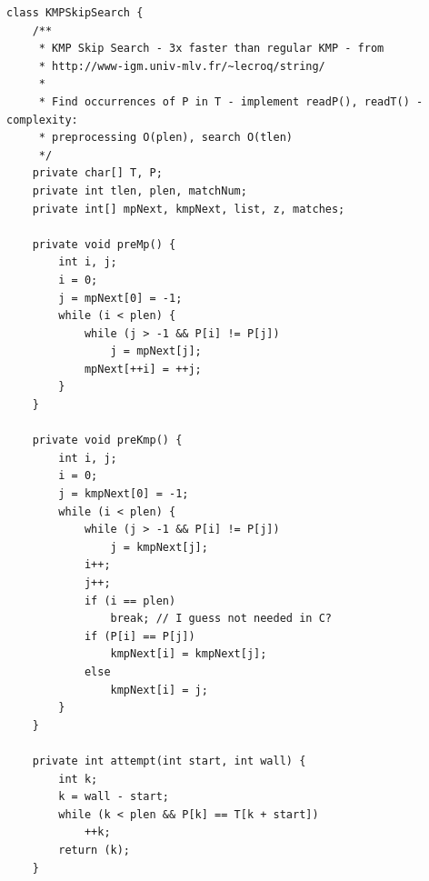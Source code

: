 \documentclass{article}
\begin{document}
\begin{verbatim}
class KMPSkipSearch {
    /**
     * KMP Skip Search - 3x faster than regular KMP - from
     * http://www-igm.univ-mlv.fr/~lecroq/string/
     * 
     * Find occurrences of P in T - implement readP(), readT() - complexity:
     * preprocessing O(plen), search O(tlen)
     */
    private char[] T, P;
    private int tlen, plen, matchNum;
    private int[] mpNext, kmpNext, list, z, matches;

    private void preMp() {
        int i, j;
        i = 0;
        j = mpNext[0] = -1;
        while (i < plen) {
            while (j > -1 && P[i] != P[j])
                j = mpNext[j];
            mpNext[++i] = ++j;
        }
    }

    private void preKmp() {
        int i, j;
        i = 0;
        j = kmpNext[0] = -1;
        while (i < plen) {
            while (j > -1 && P[i] != P[j])
                j = kmpNext[j];
            i++;
            j++;
            if (i == plen)
                break; // I guess not needed in C?
            if (P[i] == P[j])
                kmpNext[i] = kmpNext[j];
            else
                kmpNext[i] = j;
        }
    }

    private int attempt(int start, int wall) {
        int k;
        k = wall - start;
        while (k < plen && P[k] == T[k + start])
            ++k;
        return (k);
    }


\end{verbatim}
\end{document}
